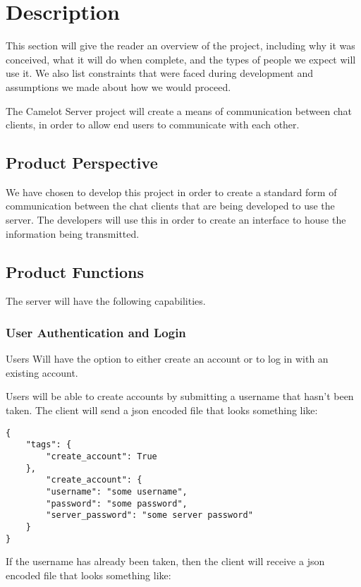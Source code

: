 \chapter{Description}\label{description}
This section will give the reader an overview of the project, including why it was conceived, what it will do when complete, and the types of people we expect will use it. We also list constraints that were faced during development and assumptions we made about how we would proceed.

The Camelot Server project will create a means of communication between chat clients, in order to allow end users to communicate with each other.

\section{Product Perspective}\label{product-perspective}
We have chosen to develop this project in order to create a standard form of communication between the chat clients that are being developed to use the server. The developers will use this in order to create an interface to house the information being transmitted.

\section{Product Functions}\label{product-functions}
The server will have the following capabilities.

\subsection{User Authentication and Login}
Users Will have the option to either create an account or to log in with an existing account.

Users will be able to create accounts by submitting a username that hasn't been taken. The client will send a \gls{json} encoded file that looks something like:

\begin{lstlisting}[style=json]
{
    "tags": {
        "create_account": True
    },
        "create_account": {
        "username": "some username",
        "password": "some password",
        "server_password": "some server password"
    }
}
\end{lstlisting}

If the username has already been taken, then the client will receive a \gls{json} encoded file that looks something like:

